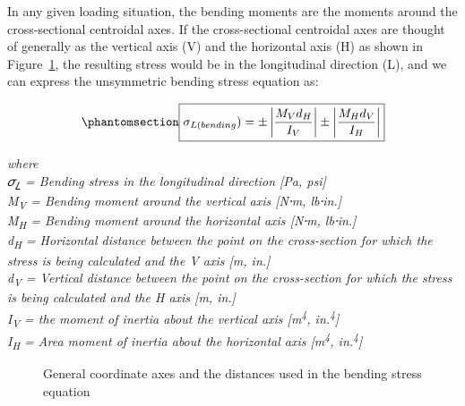 \documentclass[
  letterpaper,
  DIV=11,
  numbers=noendperiod]{scrreprt}
\theoremstyle{definition}
\theoremstyle{remark}
\begin{document}
In any given loading situation, the bending moments are the moments
around the cross-sectional centroidal axes. If the cross-sectional
centroidal axes are thought of generally as the vertical axis (V) and
the horizontal axis (H) as shown in Figure~\ref{fig-14.2}, the resulting
stress would be in the longitudinal direction (L), and we can express
the unsymmetric bending stress equation as:

\begin{equation}\phantomsection\label{eq-14.1}{
\boxed{\sigma_{L(bending})= \pm\left|\frac{M_V d_H}{I_V}\right| \pm\left|\frac{M_H d_V}{I_H}\right|}
}\end{equation}

\emph{where}\\
\emph{𝜎\textsubscript{𝐿} = Bending stress in the longitudinal direction
{[}Pa, psi{]}}\\
\emph{M\textsubscript{V} = Bending moment around the vertical axis
{[}N⸱m, lb⸱in.{]}}\\
\emph{M\textsubscript{H} = Bending moment around the horizontal axis
{[}N⸱m, lb⸱in.{]}}\\
\emph{d\textsubscript{H} = Horizontal distance between the point on the
cross-section for which the stress is being calculated and the V axis
{[}m, in.{]}}\\
\emph{d\textsubscript{V} = Vertical distance between the point on the
cross-section for which the stress is being calculated and the H axis
{[}m, in.{]}}\\
\emph{I\textsubscript{V} = the moment of inertia about the vertical axis
{[}m\textsuperscript{4}, in.\textsuperscript{4}{]}}\\
\emph{I\textsubscript{H} = Area moment of inertia about the horizontal
axis {[}m\textsuperscript{4}, in.\textsuperscript{4}{]}}

\begin{figure}


\caption{\label{fig-14.2}General coordinate axes and the distances used
in the bending stress equation}

\end{figure}%
\end{document}

